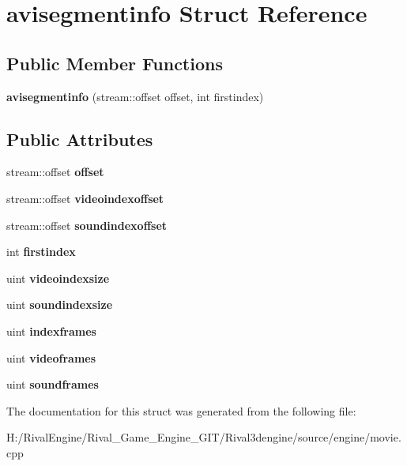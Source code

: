\hypertarget{structavisegmentinfo}{}\section{avisegmentinfo Struct Reference}
\label{structavisegmentinfo}
\subsection*{Public Member Functions}
\begin{DoxyCompactItemize}
\item 
\mbox{\label{structavisegmentinfo_af9d8d1f59eb3456d18ee8c24755b76a2}} 
{\bfseries avisegmentinfo} (stream\+::offset offset, int firstindex)
\end{DoxyCompactItemize}
\subsection*{Public Attributes}
\begin{DoxyCompactItemize}
\item 
\mbox{\label{structavisegmentinfo_aa2cbbaa0c131a7a7af85d859d5d37f28}} 
stream\+::offset {\bfseries offset}
\item 
\mbox{\label{structavisegmentinfo_afbb52be7278d80687a6fea240088aed0}} 
stream\+::offset {\bfseries videoindexoffset}
\item 
\mbox{\label{structavisegmentinfo_a5585129d57200a393eec5258bee36e04}} 
stream\+::offset {\bfseries soundindexoffset}
\item 
\mbox{\label{structavisegmentinfo_a28ce50706b61f8465b08f7fe991a33d5}} 
int {\bfseries firstindex}
\item 
\mbox{\label{structavisegmentinfo_aa72be3f32b638a9105355f3052ec284d}} 
uint {\bfseries videoindexsize}
\item 
\mbox{\label{structavisegmentinfo_aadbce42897bd993dd5b6b4b6fa93fbef}} 
uint {\bfseries soundindexsize}
\item 
\mbox{\label{structavisegmentinfo_af1edf3b8bb37f8c4ce9c2d256d48051b}} 
uint {\bfseries indexframes}
\item 
\mbox{\label{structavisegmentinfo_a25a709dcaeb42140e0c387e7f7494047}} 
uint {\bfseries videoframes}
\item 
\mbox{\label{structavisegmentinfo_ae99a59bafd10712004bd02a851594b42}} 
uint {\bfseries soundframes}
\end{DoxyCompactItemize}


The documentation for this struct was generated from the following file\+:\begin{DoxyCompactItemize}
\item 
H\+:/\+Rival\+Engine/\+Rival\+\_\+\+Game\+\_\+\+Engine\+\_\+\+G\+I\+T/\+Rival3dengine/source/engine/movie.\+cpp\end{DoxyCompactItemize}
